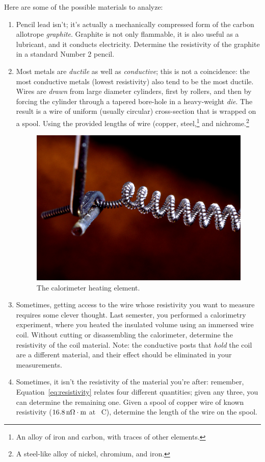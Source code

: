 \documentclass[12pt]{article}
\begin{document}
Here are some of the possible materials to analyze:
\begin{enumerate}
\item Pencil lead isn't; it's actually a mechanically compressed form
  of the carbon allotrope \textit{graphite}.  Graphite is not only
  flammable, it is also useful as a lubricant, and it conducts
  electricity.  Determine the resistivity of the graphite in a
  standard Number 2 pencil.
\item Most metals are \textit{ductile} as well as \textit{conductive};
  this is not a coincidence: the most conductive metals (lowest
  resistivity) also tend to be the most ductile.  Wires are
  \textit{drawn} from large diameter cylinders, first by rollers, and
  then by forcing the cylinder through a tapered bore-hole in a
  heavy-weight \textit{die}.  The result is a wire of uniform (usually
  circular) cross-section that is wrapped on a spool.  Using the
  provided lengths of wire (copper, steel,\footnote{An alloy of iron
    and carbon, with traces of other elements.} and
  nichrome.\footnote{A steel-like alloy of nickel, chromium, and
    iron.}
\begin{figure}
  \centering
  \includegraphics[width=\textwidth/2]{figures/filament}
  \caption{The calorimeter heating element.}
  \label{fig:calorimeter}
\end{figure}
\item Sometimes, getting access to the wire whose resistivity you want
  to measure requires some clever thought.  Last semester, you
  performed a calorimetry experiment, where you heated the insulated
  volume using an immersed wire coil.  Without cutting or
  disassembling the calorimeter, determine the resistivity of the
  coil material.  Note: the conductive posts that \textit{hold} the
  coil are a different material, and their effect should be eliminated
  in your measurements.
\item Sometimes, it isn't the resistivity of the material you're after:
  remember, Equation~\eqref{eq:resistivity} relates four different
  quantities; given any three, you can determine the remaining one.
  Given a spool of copper wire of known resistivity
  ($\unit[16.8]{n\Omega \cdot m}$ at \unit[20]{\textdegree C}),
  determine the length of the wire on the spool.
\end{enumerate}
\end{document}
